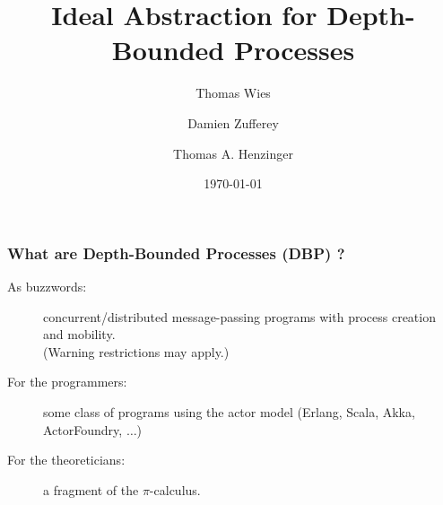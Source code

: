 \documentclass{beamer}
\title[Ideal Abstraction]{Ideal Abstraction for Depth-Bounded Processes}
\author{Thomas Wies \and \alert{Damien Zufferey} \and Thomas A. Henzinger}
\institute{
  IST Austria
}
\date{\today}
\begin{document}
\frame[plain]{\titlepage}


\begin{frame}
  \frametitle{What are Depth-Bounded Processes (DBP) ?}

  \begin{description}
  \item[As buzzwords:]
  concurrent/distributed message-passing programs with process creation and mobility.\\
  (Warning restrictions may apply.)
  \item[For the programmers:] some class of programs using the actor model (Erlang, Scala, Akka, ActorFoundry, $\ldots$)
  \item[For the theoreticians:] a fragment of the $\pi$-calculus.
  \end{description}

\end{frame}
\end{document}
